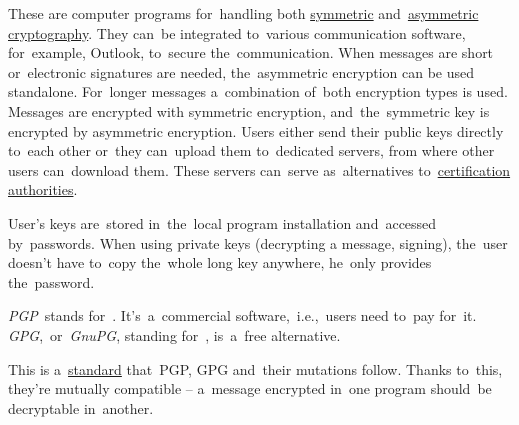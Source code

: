 \label{pgpgpg}
These are computer programs for~handling both \hyperref[symmetriccryptography]{symmetric} and~\hyperref[asymmetriccryptography]{asymmetric cryptography}.
They can~be integrated to~various communication software, for~example, Outlook, to~secure the~communication.
When messages are short or~electronic signatures are needed, the~asymmetric encryption can be used standalone.
For~longer messages a~combination of~both encryption types is used.
Messages are encrypted with symmetric encryption, and~the~symmetric key is encrypted by asymmetric encryption.
Users either send their public keys directly to~each other or~they can~upload them to~dedicated servers, from where other users can~download them.
These servers can~serve as~alternatives to~\hyperref[certificationauthority]{certification authorities}.

User's keys are~stored in~the~local program installation and~accessed by~passwords.
When using private keys (decrypting a message, signing), the~user doesn't have to~copy the~whole long key anywhere, he~only provides the~password.

\textit{PGP}~stands for~.
It's~a~commercial software,~i.e.,~users need to~pay for~it.
\mbox{\textit{GPG}, or \textit{GnuPG}}, standing for~, is~a~free alternative.

This is a~\hyperref[protocolstandard]{standard} that~PGP, GPG and~their mutations follow.
Thanks to~this, they're mutually compatible -- a~message encrypted in~one program should~be decryptable in~another.
\newpage
